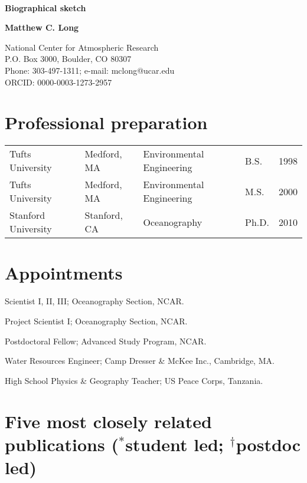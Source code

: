 \documentclass[12pt]{article}
\begin{document}
\thispagestyle{empty}

\begin{center}

\
\vspace{-2em}

\noindent
\textbf{Biographical sketch}

\textbf{Matthew C. Long}

\noindent
National Center for Atmospheric Research\\
P.O. Box 3000, Boulder, CO 80307\\
Phone: 303-497-1311; e-mail: mclong@ucar.edu\\
ORCID: 0000-0003-1273-2957
\end{center}

\vspace{-0.5em}
\section{Professional preparation}

\begin{tabular}{lllll}
Tufts University	&	Medford, MA 	& Environmental Engineering	& B.S.	& 1998 	\\
Tufts University	&  	Medford, MA		& Environmental Engineering	& M.S.	& 2000	\\
Stanford University	&	Stanford, CA	& Oceanography				& Ph.D.	& 2010
\end{tabular}


\section{Appointments}

\begin{description}[style=multiline,leftmargin=2.8cm,font=\normalfont]
\setlength{\itemsep}{-0.3em}
\item[2014--present] {Scientist I, II, III}; Oceanography Section, NCAR.
\item[2012--2014] {Project Scientist I}; Oceanography Section, NCAR.
\item[2010--2012] {Postdoctoral Fellow}; {Advanced Study Program}, NCAR.
\item[2003--2004] {Water Resources Engineer}; {Camp Dresser \& McKee Inc.}, Cambridge, MA.
\item[2000--2002] {High School Physics \& Geography Teacher}; US Peace Corps, Tanzania.
\end{description}


\section{Five most closely related publications
{\footnotesize ($^*$student led; $^\dagger$postdoc led)}}
\end{document}
